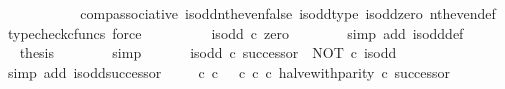 \begin{isabellebody}
\ {\isachardoublequoteopen}{\isachardot}{\kern0pt}{\isachardot}{\kern0pt}{\isachardot}{\kern0pt}\ {\isacharequal}{\kern0pt}\ {\isasymf}{\isachardoublequoteclose}\isanewline
\ \ \ \ \ \ \isamarkupfalse%
\ comp{\isacharunderscore}{\kern0pt}associative{}\ is{\isacharunderscore}{\kern0pt}odd{\isacharunderscore}{\kern0pt}nth{\isacharunderscore}{\kern0pt}even{\isacharunderscore}{\kern0pt}false\ is{\isacharunderscore}{\kern0pt}odd{\isacharunderscore}{\kern0pt}type\ is{\isacharunderscore}{\kern0pt}odd{\isacharunderscore}{\kern0pt}zero\ nth{\isacharunderscore}{\kern0pt}even{\isacharunderscore}{\kern0pt}def{}\ \isamarkupfalse%
\ {\isacharparenleft}{\kern0pt}typecheck{\isacharunderscore}{\kern0pt}cfuncs{\isacharcomma}{\kern0pt}\ force{\isacharparenright}{\kern0pt}\isanewline
\ \ \ \ \isamarkupfalse%
\ \isamarkupfalse%
\ {\isachardoublequoteopen}{\isachardot}{\kern0pt}{\isachardot}{\kern0pt}{\isachardot}{\kern0pt}\ {\isacharequal}{\kern0pt}\ is{\isacharunderscore}{\kern0pt}odd\ {\isasymcirc}\isactrlsub c\ zero{\isachardoublequoteclose}\isanewline
\ \ \ \ \ \ \isamarkupfalse%
\ {\isacharparenleft}{\kern0pt}simp\ add{\isacharcolon}{\kern0pt}\ is{\isacharunderscore}{\kern0pt}odd{\isacharunderscore}{\kern0pt}def{}{\isacharparenright}{\kern0pt}\isanewline
\ \ \ \ \isamarkupfalse%
\ \isamarkupfalse%
\ {\isacharquery}{\kern0pt}thesis\isanewline
\ \ \ \ \ \ \isamarkupfalse%
\ simp\isanewline
\ \ \isamarkupfalse%
\isanewline
\isanewline
\ \ \isamarkupfalse%
\ {\isachardoublequoteopen}is{\isacharunderscore}{\kern0pt}odd\ {\isasymcirc}\isactrlsub c\ successor\ {\isacharequal}{\kern0pt}\ NOT\ {\isasymcirc}\isactrlsub c\ is{\isacharunderscore}{\kern0pt}odd{\isachardoublequoteclose}\isanewline
\ \ \ \ \isamarkupfalse%
\ {\isacharparenleft}{\kern0pt}simp\ add{\isacharcolon}{\kern0pt}\ is{\isacharunderscore}{\kern0pt}odd{\isacharunderscore}{\kern0pt}successor{\isacharparenright}{\kern0pt}\isanewline
\isanewline
\ \ \isamarkupfalse%
\ {\isachardoublequoteopen}{\isacharparenleft}{\kern0pt}{\isacharparenleft}{\kern0pt}{\isasymf}\ {\isasymcirc}\isactrlsub c\ {\isasymbeta}\isactrlbsub {\isasymnat}\isactrlsub c\isactrlesub {\isacharparenright}{\kern0pt}\ {\isasymamalg}\ {\isacharparenleft}{\kern0pt}{\isasymt}\ {\isasymcirc}\isactrlsub c\ {\isasymbeta}\isactrlbsub {\isasymnat}\isactrlsub c\isactrlesub {\isacharparenright}{\kern0pt}\ {\isasymcirc}\isactrlsub c\ halve{\isacharunderscore}{\kern0pt}with{\isacharunderscore}{\kern0pt}parity{\isacharparenright}{\kern0pt}\ {\isasymcirc}\isactrlsub c\ successor\ {\isacharequal}{\kern0pt}\isanewline

\end{isabellebody}
